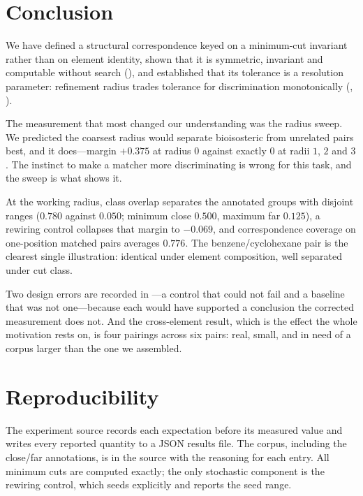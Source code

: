 \documentclass[11pt,twocolumn,a4paper]{article}
\theoremstyle{scthm}
\theoremstyle{definition}
\theoremstyle{remark}
\begin{document}
\section{Conclusion}
\label{sec:conclusion}

We have defined a structural correspondence keyed on a minimum-cut
invariant rather than on element identity, shown that it is symmetric,
invariant and computable without search
(), and established that its
tolerance is a resolution parameter: refinement radius trades tolerance
for discrimination monotonically (,
).

The measurement that most changed our understanding was the radius sweep.
We predicted the coarsest radius would separate bioisosteric from
unrelated pairs best, and it does---margin $+0.375$ at radius $0$ against
exactly $0$ at radii $1$, $2$ and $3$. The instinct to make a matcher more
discriminating is wrong for this task, and the sweep is what shows it.

At the working radius, class overlap separates the annotated groups with
disjoint ranges ($0.780$ against $0.050$; minimum close $0.500$, maximum
far $0.125$), a rewiring control collapses that margin to $-0.069$, and
correspondence coverage on one-position matched pairs averages $0.776$.
The benzene/cyclohexane pair is the clearest single illustration:
identical under element composition, well separated under cut class.

Two design errors are recorded in ---a control that could
not fail and a baseline that was not one---because each would have
supported a conclusion the corrected measurement does not. And the
cross-element result, which is the effect the whole motivation rests on,
is four pairings across six pairs: real, small, and in need of a corpus
larger than the one we assembled.

\section*{Reproducibility}

The experiment source records each expectation before its measured value
and writes every reported quantity to a JSON results file. The corpus,
including the \textsf{close}/\textsf{far} annotations, is in the source
with the reasoning for each entry. All minimum cuts are computed exactly;
the only stochastic component is the rewiring control, which seeds
explicitly and reports the seed range.



\end{document}
